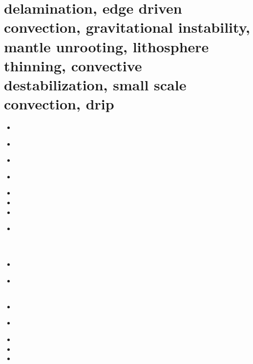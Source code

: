 \section{delamination, edge driven convection, gravitational instability, 
mantle unrooting, lithosphere thinning, convective destabilization, 
small scale convection, drip} 

\begin{small}
\begin{itemize}
\item[\nineteenseventynine] 
\item[\nineteeneightyone] 
 \\
\item[\nineteeneightyfive] 
\item[\nineteeneightysix] 
 \\ 
\item[\nineteenninetythree] 
\item[\nineteenninetyfive] 
\item[\nineteenninetyseven] 
\item[\nineteenninetyeight] 
\\ 
 \\
 \\
\item[\nineteenninetynine] 
 \\
\item[\twothousand] 
 \\
 \\
\item[\twothousandone] 
\item[\twothousandtwo] 
 \\ 
\item[\twothousandthree] 
\item[\twothousandfour] 
\item[\twothousandsix] 

\end{itemize}
\end{small}
